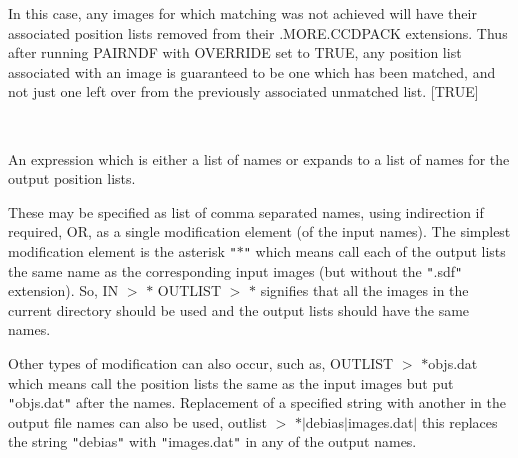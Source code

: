 \documentclass[twoside,11pt]{article}
\renewcommand{\_}{\texttt{\symbol{95}}}
\newcommand{\routine}[1]{{\sc #1}}
\newcommand{\sstsubsection}[1]{ \item[{#1}] \mbox{} \\}
\newcommand{\sstsubsection}[1]{\item[{#1}]}
\begin{document}
{{{         In this case, any images for which matching was not
         achieved will have their associated position lists removed
         from their .MORE.CCDPACK extensions.  Thus after running
         \routine{PAIRNDF} with OVERRIDE set to TRUE, any position list associated
         with an image is guaranteed to be one which has been matched, and
         not just one left over from the previously associated unmatched
         list.
         [TRUE]
      }
      \sstsubsection{
         OUTLIST = LITERAL (Read)
      }{
         An expression which is either a list of names or expands to a
         list of names for the output position lists.

         These may be specified as list of comma separated names,
         using indirection if required, OR, as a single modification
         element (of the input names). The simplest modification
         element is the asterisk {\tt "}$*${\tt "} which means call each of the
         output lists the same name as the corresponding input images (but
         without the {\tt "}.sdf{\tt "} extension).
         So,
            IN $>$ $*$
            OUTLIST $>$ $*$
         signifies that all the images in the current directory should be
         used and the output lists should have the same names.

         Other types of modification can also occur, such as,
            OUTLIST $>$ $*$\_objs.dat
         which means call the position lists the same as the input images
         but put {\tt "}\_objs.dat{\tt "} after the names. Replacement of a specified
         string with another in the output file names can also be used,
            outlist $>$ $*$$|$\_debias$|$\_images.dat$|$
         this replaces the string {\tt "}\_debias{\tt "} with {\tt "}\_images.dat{\tt "} in any
         of the output names.

}}}
\end{document}
